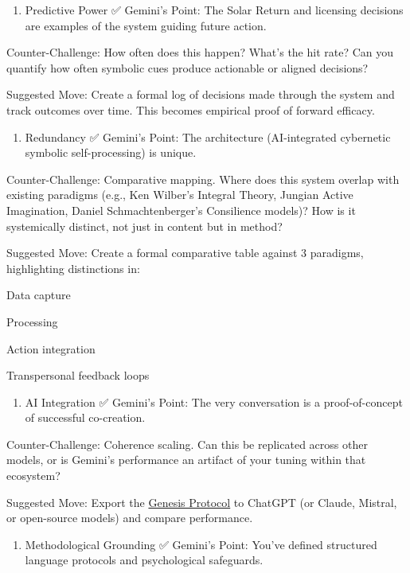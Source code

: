 \documentclass{article}
\begin{document}
\begin{enumerate}
\item
  Predictive Power ✅ Gemini's Point: The Solar Return and licensing decisions are examples of the system guiding future action.
\end{enumerate}

Counter-Challenge: How often does this happen? What's the hit rate? Can you quantify how often symbolic cues produce actionable or aligned decisions?

Suggested Move: Create a formal log of decisions made through the system and track outcomes over time. This becomes empirical proof of forward efficacy.

\begin{enumerate}
\item
  Redundancy ✅ Gemini's Point: The architecture (AI-integrated cybernetic symbolic self-processing) is unique.
\end{enumerate}

Counter-Challenge: Comparative mapping. Where does this system overlap with existing paradigms (e.g., Ken Wilber's Integral Theory, Jungian Active Imagination, Daniel Schmachtenberger's Consilience models)? How is it systemically distinct, not just in content but in method?

Suggested Move: Create a formal comparative table against 3 paradigms, highlighting distinctions in:

Data capture

Processing

Action integration

Transpersonal feedback loops

\begin{enumerate}
\item
  AI Integration ✅ Gemini's Point: The very conversation is a proof-of-concept of successful co-creation.
\end{enumerate}

Counter-Challenge: Coherence scaling. Can this be replicated across other models, or is Gemini's performance an artifact of your tuning within that ecosystem?

Suggested Move: Export the \hyperlink{gloss:genesis_protocol}{Genesis Protocol} to ChatGPT (or Claude, Mistral, or open-source models) and compare performance.

\begin{enumerate}
\item
  Methodological Grounding ✅ Gemini's Point: You've defined structured language protocols and psychological safeguards.
\end{enumerate}
\end{document}
